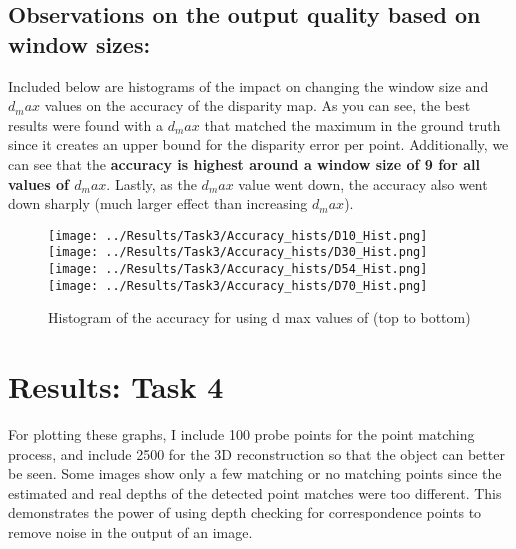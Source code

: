 \documentclass{article}
\begin{document}
\subsection{Observations on the output quality based on window sizes:}
Included below are histograms of the impact on changing the window size and $d_max$ values on the accuracy of the disparity map. As you can see, the best results were found with a $d_max$ that matched the maximum in the ground truth since it creates an upper bound for the disparity error per point. Additionally, we can see that the \textbf{accuracy is highest around a window size of 9 for all values of $d_max$}. Lastly, as the $d_max$ value went down, the accuracy also went down sharply (much larger effect than increasing $d_max$).
\begin{figure}[H]
    \centering
    \texttt{[image: ../Results/Task3/Accuracy\_hists/D10\_Hist.png]}
    \texttt{[image: ../Results/Task3/Accuracy\_hists/D30\_Hist.png]}
    \texttt{[image: ../Results/Task3/Accuracy\_hists/D54\_Hist.png]}
    \texttt{[image: ../Results/Task3/Accuracy\_hists/D70\_Hist.png]}
    \caption{Histogram of the accuracy for using d max values of  (top to bottom)}
\end{figure}

\section{Results: Task 4}
For plotting these graphs, I include 100 probe points for the point matching process, and include 2500 for the 3D reconstruction so that the object can better be seen. Some images show only a few matching or no matching points since the estimated and real depths of the detected point matches were too different. This demonstrates the power of using depth checking for correspondence points to remove noise in the output of an image.
\end{document}
